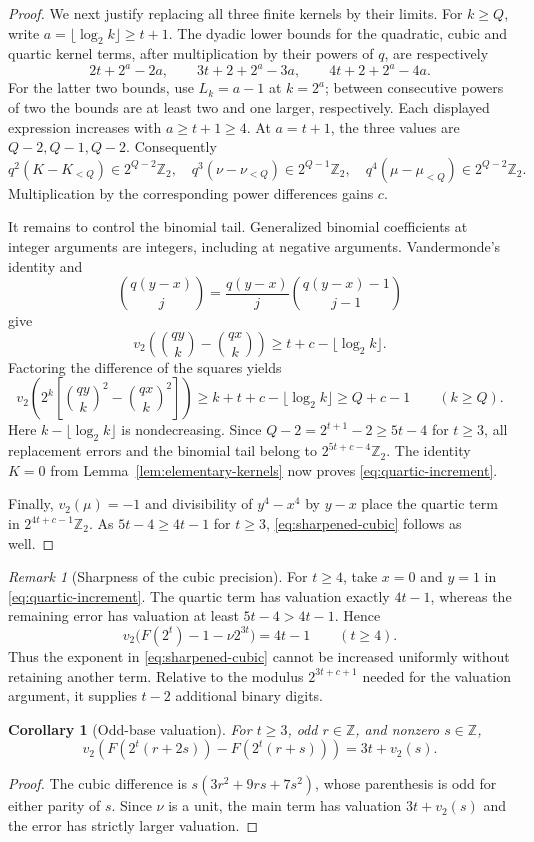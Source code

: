 \documentclass[11pt]{article}
\newtheorem{corollary}[theorem]{Corollary}
\theoremstyle{remark}\newtheorem{remark}[theorem]{Remark}
\newcommand{\Ztwo}{\mathbb Z_2}\newcommand{\Qtwo}{\mathbb Q_2}
\begin{document}
\begin{proof}
We next justify replacing all three finite kernels by their limits.
For $k\ge Q$, write $a=\lfloor\log_2k\rfloor\ge t+1$.
The dyadic lower bounds for the quadratic, cubic and quartic
kernel terms, after multiplication by their powers of $q$, are
respectively
\[
 2t+2^a-2a,\qquad
 3t+2+2^a-3a,\qquad
 4t+2+2^a-4a.
\]
For the latter two bounds, use $L_k=a-1$ at $k=2^a$;
between consecutive powers of two the bounds are at least two and
one larger, respectively. Each displayed expression increases with
$a\ge t+1\ge4$. At $a=t+1$, the three values are $Q-2,Q-1,Q-2$.
Consequently
\[
 q^2(K-K_{<Q})\in2^{Q-2}\Ztwo,\quad
 q^3(\nu-\nu_{<Q})\in2^{Q-1}\Ztwo,\quad
 q^4(\mu-\mu_{<Q})\in2^{Q-2}\Ztwo.
\]
Multiplication by the corresponding power differences gains $c$.

It remains to control the binomial tail. Generalized binomial
coefficients at integer arguments are integers, including at negative
arguments. Vandermonde's identity and
\[
 \binom{q(y-x)}j=\frac{q(y-x)}j\binom{q(y-x)-1}{j-1}
\]
give
\[
 v_2\!\left(\binom{qy}{k}-\binom{qx}{k}\right)
 \ge t+c-\lfloor\log_2k\rfloor.
\]
Factoring the difference of the squares yields
\[
 v_2\!\left(2^k\left[\binom{qy}{k}^2-\binom{qx}{k}^2\right]\right)
 \ge k+t+c-\lfloor\log_2k\rfloor
 \ge Q+c-1\qquad(k\ge Q).
\]
Here $k-\lfloor\log_2k\rfloor$ is nondecreasing.
Since $Q-2=2^{t+1}-2\ge5t-4$ for $t\ge3$, all replacement errors
and the binomial tail belong to $2^{5t+c-4}\Ztwo$.
The identity $K=0$ from Lemma~\ref{lem:elementary-kernels}
now proves \eqref{eq:quartic-increment}.

Finally, $v_2(\mu)=-1$ and divisibility of $y^4-x^4$ by $y-x$
place the quartic term in $2^{4t+c-1}\Ztwo$.
As $5t-4\ge4t-1$ for $t\ge3$,
\eqref{eq:sharpened-cubic} follows as well.
\end{proof}

\begin{remark}[Sharpness of the cubic precision]\label{rem:cubic-sharpness}
For $t\ge4$, take $x=0$ and $y=1$ in
\eqref{eq:quartic-increment}. The quartic term has valuation exactly
$4t-1$, whereas the remaining error has valuation at least
$5t-4>4t-1$. Hence
\[
 v_2\bigl(F(2^t)-1-\nu2^{3t}\bigr)=4t-1\qquad(t\ge4).
\]
Thus the exponent in \eqref{eq:sharpened-cubic} cannot be increased
uniformly without retaining another term. Relative to the modulus
$2^{3t+c+1}$ needed for the valuation argument, it supplies
$t-2$ additional binary digits.
\end{remark}


\begin{corollary}[Odd-base valuation]\label{cor:odd-base-t3}
For $t\ge3$, odd $r\in\mathbb Z$, and nonzero $s\in\mathbb Z$,
\[
 v_2\left(F(2^t(r+2s))-F(2^t(r+s))\right)=3t+v_2(s).
\]
\end{corollary}
\begin{proof}
The cubic difference is
$s(3r^2+9rs+7s^2)$, whose parenthesis is odd for either parity of $s$.
Since $\nu$ is a unit, the main term has valuation $3t+v_2(s)$
and the error has strictly larger valuation.
\end{proof}
\end{document}
